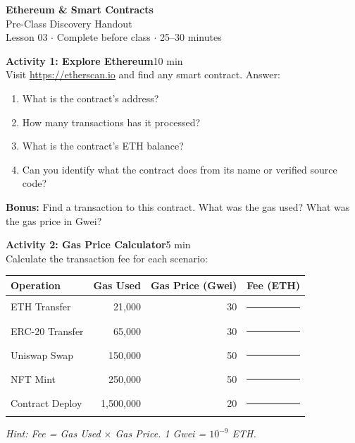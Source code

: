 \documentclass[11pt,a4paper]{article}
\newcommand{\activitybox}[3]{%
  \noindent\colorbox{mllavender4}{\parbox{\dimexpr\linewidth-2\fboxsep}{%
    \textbf{\color{mlpurple}#1}\hfill\textcolor{mlgray}{\small #2}\\[2pt]#3%
  }}\par\vspace{4pt}%
}
\newcommand{\fillcell}{\rule{2.2cm}{0.3pt}}
\begin{document}
\begin{center}
{\LARGE\color{mlpurple}\textbf{Ethereum \& Smart Contracts}}\\[4pt]
{\large\color{mlblue}Pre-Class Discovery Handout}\\[2pt]
{\small\color{mlgray}Lesson 03 $\cdot$ Complete before class $\cdot$ 25--30 minutes}
\end{center}
\vspace{4pt}

\activitybox{Activity 1: Explore Ethereum}{10 min}{%
Visit \url{https://etherscan.io} and find any smart contract. Answer:
\begin{enumerate}
\item What is the contract's address?
\item How many transactions has it processed?
\item What is the contract's ETH balance?
\item Can you identify what the contract does from its name or verified source code?
\end{enumerate}
\textbf{Bonus:} Find a transaction to this contract. What was the gas used? What was the gas price in Gwei?
}

\vspace{2pt}

\activitybox{Activity 2: Gas Price Calculator}{5 min}{%
Calculate the transaction fee for each scenario:
\begin{center}
\renewcommand{\arraystretch}{1.3}
\begin{tabular}{lrrr}
\toprule
\textbf{Operation} & \textbf{Gas Used} & \textbf{Gas Price (Gwei)} & \textbf{Fee (ETH)} \\
\midrule
ETH Transfer      & 21{,}000    & 30 & \fillcell \\
ERC-20 Transfer   & 65{,}000    & 30 & \fillcell \\
Uniswap Swap      & 150{,}000   & 50 & \fillcell \\
NFT Mint          & 250{,}000   & 50 & \fillcell \\
Contract Deploy   & 1{,}500{,}000 & 20 & \fillcell \\
\bottomrule
\end{tabular}
\end{center}
\textit{Hint: Fee = Gas Used $\times$ Gas Price. 1 Gwei = $10^{-9}$ ETH.}
}
\end{document}
